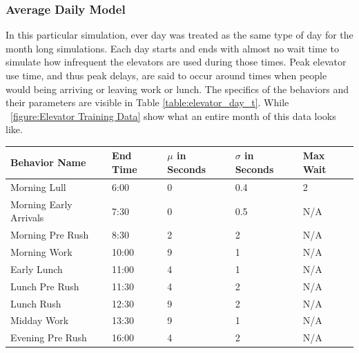   \subsubsection{ Average Daily Model}
  In this particular simulation, ever day was treated as the same type of day
  for the month long simulations. Each day starts and ends with almost no wait
  time to simulate how infrequent the elevators are used during those times.
  Peak elevator use time, and thus peak delays, are said to occur around times
  when people would being arriving or leaving work or lunch. The specifics of
  the behaviors and their parameters are visible in Table
  \ref{table:elevator_day_t}. While ~\ref{figure:Elevator Training Data} show
  what an entire month of this data looks like.

  \begin{table}[!htb]
    \begin{tabular}{|l|l|l|l|l|}
      \hline
      Behavior Name          & End Time & $\mu$ in Seconds & $\sigma$ in Seconds & Max Wait \\ \hline
      Morning Lull           & 6:00     & 0                                 & 0.4                           & 2        \\ \hline
      Morning Early Arrivals & 7:30     & 0                                 & 0.5                           & N/A      \\ \hline
      Morning Pre Rush       & 8:30     & 2                                 & 2                             & N/A      \\ \hline
      Morning Work           & 10:00    & 9                                 & 1                             & N/A      \\ \hline
      Early Lunch            & 11:00    & 4                                 & 1                             & N/A      \\ \hline
      Lunch Pre Rush         & 11:30    & 4                                 & 2                             & N/A      \\ \hline
      Lunch Rush             & 12:30    & 9                                 & 2                             & N/A      \\ \hline
      Midday Work            & 13:30    & 9                                 & 1                             & N/A      \\ \hline
      Evening Pre Rush       & 16:00    & 4                                 & 2                             & N/A      \\ \hline

\end{tabular}
\end{table}
